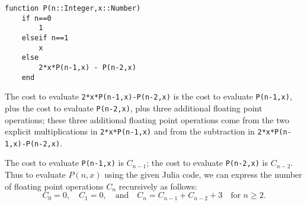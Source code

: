 \documentclass[12pt,fleqn,answers]{exam}
\begin{document}
\begin{questions}
\begin{verbatim}
function P(n::Integer,x::Number)
    if n==0
        1
    elseif n==1 
        x
    else
        2*x*P(n-1,x) - P(n-2,x)
    end
\end{verbatim}

\begin{solution}[3.5in]
The cost to evaluate \verb|2*x*P(n-1,x)-P(n-2,x)| is the cost 
to evaluate   \verb|P(n-1,x)|, plus the cost to evaluate 
 \verb|P(n-2,x)|, plus three additional floating point operations;
 these three additional floating point operations  come from the two explicit multiplications in 
 \verb|2*x*P(n-1,x)| and from the subtraction in \verb|2*x*P(n-1,x)-P(n-2,x)|. 
 
 \quad The cost to evaluate \verb|P(n-1,x)| is $C_{n-1}$; the cost to evaluate   \verb|P(n-2,x)| is $C_{n-2}.$
 Thus 
to evaluate $P(n,x)$ using the given Julia code, we can express the number of floating point operations $C_n$ recursively as follows:
\[C_0 = 0, \quad C_1 = 0, \quad \text{and} \quad C_{n} = C_{n-1} + C_{n-2} + 3 \quad \text{for } n \geq 2.\]
\end{solution}


\end{questions}
\end{document}
